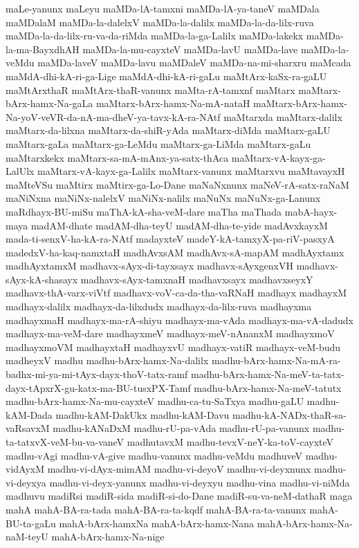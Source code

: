 {maLe-yanunx
maLeyu
maMDa-lA-tamxni
maMDa-lA-ya-taneV
maMDala
maMDalaM
maMDa-la-dalelxV
maMDa-la-dalilx
maMDa-la-da-lilx-ruva
maMDa-la-da-lilx-ru-va-da-riMda
maMDa-la-ga-Lalilx
maMDa-lakekx
maMDa-la-ma-BayxdhAH
maMDa-la-mu-cayxteV
maMDa-lavU
maMDa-lave
maMDa-la-veMdu
maMDa-laveV
maMDa-lavu
maMDaleV
maMDa-na-mi-sharxru
maMcada
maMdA-dhi-kA-ri-ga-Lige
maMdA-dhi-kA-ri-gaLu
maMtArx-kaSx-ra-gaLU
maMtArxthaR
maMtArx-thaR-vanunx
maMta-rA-tamxnf
maMtarx
maMtarx-bArx-hamx-Na-gaLa
maMtarx-bArx-hamx-Na-mA-nataH
maMtarx-bArx-hamx-Na-yoV-veVR-da-nA-ma-dheV-ya-tavx-kA-ra-NAtf
maMtarxda
maMtarx-dalilx
maMtarx-da-lilxna
maMtarx-da-shiR-yAda
maMtarx-diMda
maMtarx-gaLU
maMtarx-gaLa
maMtarx-ga-LeMdu
maMtarx-ga-LiMda
maMtarx-gaLu
maMtarxkekx
maMtarx-sa-mA-mAnx-ya-satx-thAca
maMtarx-vA-kayx-ga-LalUlx
maMtarx-vA-kayx-ga-Lalilx
maMtarx-vanunx
maMtarxvu
maMtavayxH
maMteVSu
maMtirx
maMtirx-ga-Lo-Dane
maNaNxnunx
maNeV-rA-satx-raNaM
maNiNxna
maNiNx-nalelxV
maNiNx-nalilx
maNuNx
maNuNx-ga-Lanunx
maRdhayx-BU-miSu
maThA-kA-sha-veM-dare
maTha
maThada
mabA-hayx-maya
madAM-dhate
madAM-dha-teyU
madAM-dha-te-yide
madAvxkayxM
mada-ti-senxV-ha-kA-ra-NAtf
madayxteV
madeY-kA-tamxyX-pa-riV-pasxyA
madedxV-ha-kaq-namxtaH
madhAvxsAM
madhAvx-sA-mapAM
madhAyxtamx
madhAyxtamxM
madhavx-sAyx-di-tayxsayx
madhavx-sAyxgenxVH
madhavx-sAyx-kA-shasayx
madhavx-sAyx-tamxnaH
madhavxsayx
madhavxseyxY
madhavx-thA-varx-viVtf
madhavx-voV-ca-da-tha-vaRNaH
madhayx
madhayxM
madhayx-dalilx
madhayx-da-lilxdudx
madhayx-da-lilx-ruva
madhayxma
madhayxmaH
madhayx-ma-rA-shiyu
madhayx-ma-vAda
madhayx-ma-vA-dadudx
madhayx-ma-veM-dare
madhayxmeV
madhayx-meV-nAnanxM
madhayxmoV
madhayxmoVM
madhayxtaH
madhayxvU
madhayx-vatiR
madhayx-veM-budu
madheyxV
madhu
madhu-bArx-hamx-Na-dalilx
madhu-bArx-hamx-Na-mA-ra-badhx-mi-ya-mi-tAyx-dayx-thoV-tatx-ramf
madhu-bArx-hamx-Na-meV-ta-tatx-dayx-tApxrX-gu-katx-ma-BU-tusxPX-Tamf
madhu-bArx-hamx-Na-meV-tatutx
madhu-bArx-hamx-Na-mu-cayxteV
madhu-ca-tu-SaTxya
madhu-gaLU
madhu-kAM-Dada
madhu-kAM-DakUkx
madhu-kAM-Davu
madhu-kA-NADx-thaR-sa-vaRsavxM
madhu-kANaDxM
madhu-rU-pa-vAda
madhu-rU-pa-vanunx
madhu-ta-tatxvX-veM-bu-va-vaneV
madhutavxM
madhu-tevxV-neY-ka-toV-cayxteV
madhu-vAgi
madhu-vA-give
madhu-vanunx
madhu-veMdu
madhuveV
madhu-vidAyxM
madhu-vi-dAyx-mimAM
madhu-vi-deyoV
madhu-vi-deyxnunx
madhu-vi-deyxya
madhu-vi-deyx-yanunx
madhu-vi-deyxyu
madhu-vina
madhu-vi-niMda
madhuvu
madiRsi
madiR-sida
madiR-si-do-Dane
madiR-su-va-neM-dathaR
maga
mahA
mahA-BA-ra-tada
mahA-BA-ra-ta-kqdf
mahA-BA-ra-ta-vanunx
mahA-BU-ta-gaLu
mahA-bArx-hamxNa
mahA-bArx-hamx-Nana
mahA-bArx-hamx-Na-naM-teyU
mahA-bArx-hamx-Na-nige
}

